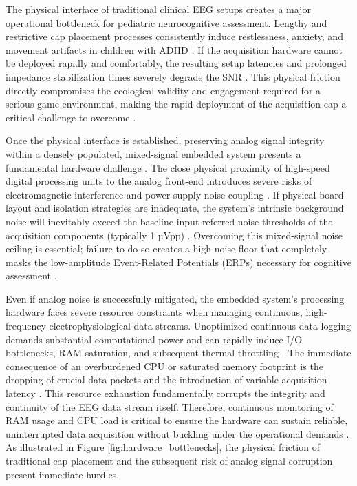 The physical interface of traditional clinical EEG setups creates a major operational bottleneck for pediatric neurocognitive assessment. Lengthy and restrictive cap placement processes consistently induce restlessness, anxiety, and movement artifacts in children with ADHD \cite{Lim2023}. If the acquisition hardware cannot be deployed rapidly and comfortably, the resulting setup latencies and prolonged impedance stabilization times severely degrade the \gls{SNR} \cite{gorjan2022removal}. This physical friction directly compromises the ecological validity and engagement required for a serious game environment, making the rapid deployment of the acquisition cap a critical challenge to overcome \cite{kaongoen2023future}.

Once the physical interface is established, preserving analog signal integrity within a densely populated, mixed-signal embedded system presents a fundamental hardware challenge \cite{liu2024design}. The close physical proximity of high-speed digital processing units to the analog front-end introduces severe risks of electromagnetic interference and power supply noise coupling \cite{devi2022survey}. If physical board layout and isolation strategies are inadequate, the system's intrinsic background noise will inevitably exceed the baseline input-referred noise thresholds of the acquisition components (typically 1 µVpp) \cite{rashid2018eeg}. Overcoming this mixed-signal noise ceiling is essential; failure to do so creates a high noise floor that completely masks the low-amplitude Event-Related Potentials (\glspl{ERP}) necessary for cognitive assessment \cite{kim2022miniaturization}.

Even if analog noise is successfully mitigated, the embedded system's processing hardware faces severe resource constraints when managing continuous, high-frequency electrophysiological data streams. Unoptimized continuous data logging demands substantial computational power and can rapidly induce I/O bottlenecks, RAM saturation, and subsequent thermal throttling \cite{battaglia2022eeg}. The immediate consequence of an overburdened CPU or saturated memory footprint is the dropping of crucial data packets and the introduction of variable acquisition latency \cite{arroba2024sustainable}. This resource exhaustion fundamentally corrupts the integrity and continuity of the EEG data stream itself. Therefore, continuous monitoring of RAM usage and CPU load is critical to ensure the hardware can sustain reliable, uninterrupted data acquisition without buckling under the operational demands \cite{ajmeria2022critical}. As illustrated in Figure \ref{fig:hardware_bottlenecks}, the physical friction of traditional cap placement and the subsequent risk of analog signal corruption present immediate hurdles.


